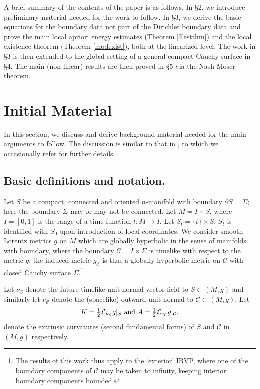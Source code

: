 \documentclass[10pt]{amsart}
\newcommand{\Si}{\Sigma}
\newcommand{\cC}{{\mathcal C}}
\newcommand{\cL}{{\mathcal L}}
\newcommand{\p}{\partial}
\renewcommand{\to}{\rightarrow}
\newcommand{\<}{\langle}
\renewcommand{\>}{\rangle}
\theoremstyle{plain}
\theoremstyle{remark}
\theoremstyle{definition}
\numberwithin{equation}{section}
\begin{document}
  A brief summary of the contents of the paper is as follows. In \S 2, we introduce preliminary material needed for the work to follow. In \S 3, we derive the basic 
equations for the boundary data not part of the Dirichlet boundary data and prove the main local apriori energy estimates (Theorem \ref{Eestthm}) and the local 
existence theorem (Theorem \ref{modexist}), both at the linearized level. The work in \S 3 is then extended to the global setting of a general compact 
Cauchy surface in \S 4. The main (non-linear) results are then proved in \S 5 via the Nash-Moser theorem. 

\section{Initial Material}

  In this section, we discuss and derive background material needed for the main arguments to follow. The discussion is similar to that in 
\cite{I}, to which we occasionally refer for further details. 

 \subsection{Basic definitions and notation.}

  Let $S$ be a compact, connected and oriented $n$-manifold with boundary $\p S = \Si$; here the boundary $\Si$ may or may not be connected. Let $M = I\times S$, 
where $I = [0,1]$ is the range of a  time function $t: M \to I$. Let $S_t = \{t\}\times S$; $S_t$ is identified with $S_0$ upon introduction of local coordinates. 
We consider smooth Lorentz metrics $g$ on $M$ which are globally hyperbolic in the sense of manifolds with boundary, where the boundary $\cC = I\times \Si$ is 
timelike with respect to the metric $g$; the induced metric $g_{\cC}$ is thus a globally hyperbolic metric on $\cC$ with closed Cauchy surface $\Si$.\footnote{The 
results of this work thus apply to the `exterior' IBVP, where one of the boundary components of $\cC$ may be taken to infinity, keeping interior boundary 
components bounded.} 
 
   Let $\nu_S$ denote the future timelike unit normal vector field to $S \subset (M, g)$ and similarly let $\nu_{\cC}$ denote the (spacelike) 
 outward unit normal to $\cC \subset (M, g)$. Let 
 $$K = \tfrac{1}{2}\cL_{\nu_S}g |_S \ {\rm and} \  A = \tfrac{1}{2}\cL_{\nu_{\cC}}g |_{\cC},$$
denote the extrinsic curvatures (second fundamental forms) of $S$ and $\cC$ in $(M, g)$ respectively. 
\end{document}
